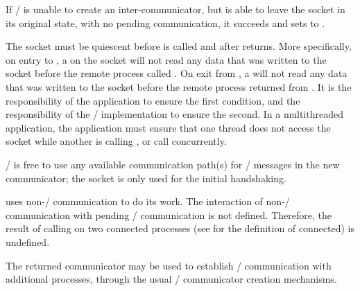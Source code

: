 If \MPI/ is unable to create an inter-communicator, but
is able to leave the socket in its original state, with no
pending communication, it succeeds and
sets  to .

The socket must be quiescent before
 is called and
after  returns. More specifically, on entry to
, a  on the socket will not read any data
that was written to the socket before the remote process called
. On exit from , a 
will not read any data that was written to the socket before the
remote process returned from . It is the
responsibility of the application to ensure the first condition, and
the responsibility of the \MPI/ implementation to ensure the second.
In a multithreaded application, the application must ensure that
one thread does not access the socket while another is calling
, or call  concurrently.

\begin{implementors}
\MPI/ is free to use any available communication path(s) for \MPI/
messages in the new communicator; the socket is only used for the
initial handshaking.
\end{implementors}

 uses non-\MPI/ communication to do its work.
The interaction of non-\MPI/ communication with pending \MPI/
communication is not defined. Therefore, the result of calling
 on two connected processes
(see  for the definition of connected) is
undefined.


The returned communicator may be used to establish \MPI/
communication with additional processes, through the usual \MPI/
communicator creation mechanisms.


